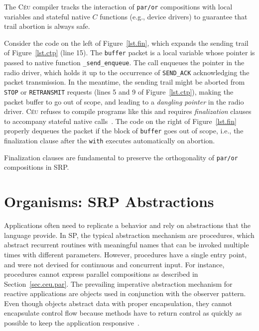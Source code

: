 \documentclass{acm_proc_article-sp}
\newcommand{\CEU}{\textsc{C\'{e}u}\xspace}
\newcommand{\code}[1] {{\small{\texttt{#1}}}}
\newcommand{\1}{\;}
\newcommand{\2}{\;\;}
\newcommand{\3}{\;\;\;}
\newcommand{\5}{\;\;\;\;\;}
\begin{document}

%
The \CEU compiler tracks the interaction of \code{par/or} compositions with 
local variables and stateful native $C$ functions (e.g., device drivers) to 
guarantee that trail abortion is always safe.

Consider the code on the left of Figure~\ref{lst.fin}, which expands the 
sending trail of Figure~\ref{lst.ctp} (line 15).
%
The \code{buffer} packet is a local variable whose pointer is passed to native 
function \code{\_send\_enqueue}.
The call enqueues the pointer in the radio driver, which holds it up to the 
occurrence of \code{SEND\_ACK} acknowledging the packet transmission.
%
In the meantime, the sending trail might be aborted from \code{STOP} or 
\code{RETRANSMIT} requests (lines 5 and 9 of Figure~\ref{lst.ctp}), making the 
packet buffer to go out of scope, and leading to a \emph{dangling pointer} in 
the radio driver.
%
\CEU refuses to compile programs like this and requires \emph{finalization} 
clauses to accompany stateful native calls~\cite{ceu.sensys13}.
The code on the right of Figure~\ref{lst.fin} properly dequeues the packet if
the block of \code{buffer} goes out of scope, i.e., the finalization clause 
after the \code{with} executes automatically on abortion.

Finalization clauses are fundamental to preserve the orthogonality of 
\code{par/or} compositions in SRP.

\section{Organisms: SRP Abstractions}
\label{sec.orgs}

Applications often need to replicate a behavior and rely on abstractions that 
the language provide.
%
In SP, the typical abstraction mechanism are procedures, which abstract
recurrent routines with meaningful names that can be invoked multiple times 
with different parameters.
%
However, procedures have a single entry point, and were not devised for 
continuous and concurrent input.
For instance, procedures cannot express parallel compositions as described in 
Section~\ref{sec.ceu.par}.
%
The prevailing imperative abstraction mechanism for reactive applications are 
objects used in conjunction with the observer pattern.
Even though objects abstract data with proper encapsulation, they cannot 
encapsulate control flow because methods have to return control as quickly as 
possible to keep the application responsive~\cite{TODO.games.patterns}.
\end{document}
